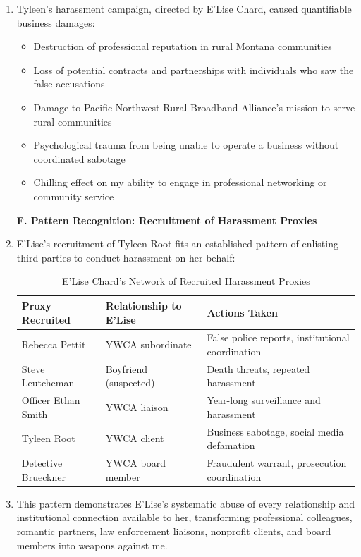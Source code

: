\documentclass[12pt,letterpaper]{article}
\begin{document}
\begin{enumerate}
\textbf{E. Business Damages from Tyleen Root Campaign}

\item Tyleen's harassment campaign, directed by E'Lise Chard, caused quantifiable business damages:

\begin{itemize}
\item Destruction of professional reputation in rural Montana communities
\item Loss of potential contracts and partnerships with individuals who saw the false accusations
\item Damage to Pacific Northwest Rural Broadband Alliance's mission to serve rural communities
\item Psychological trauma from being unable to operate a business without coordinated sabotage
\item Chilling effect on my ability to engage in professional networking or community service
\end{itemize}

\textbf{F. Pattern Recognition: Recruitment of Harassment Proxies}

\item E'Lise's recruitment of Tyleen Root fits an established pattern of enlisting third parties to conduct harassment on her behalf:

\begin{table}[h]
\begin{tabular}{|l|l|l|}
\hline
\textbf{Proxy Recruited} & \textbf{Relationship to E'Lise} & \textbf{Actions Taken} \\
\hline
Rebecca Pettit & YWCA subordinate & False police reports, institutional coordination \\
\hline
Steve Leutcheman & Boyfriend (suspected) & Death threats, repeated harassment \\
\hline
Officer Ethan Smith & YWCA liaison & Year-long surveillance and harassment \\
\hline
Tyleen Root & YWCA client & Business sabotage, social media defamation \\
\hline
Detective Brueckner & YWCA board member & Fraudulent warrant, prosecution coordination \\
\hline
\end{tabular}
\caption{E'Lise Chard's Network of Recruited Harassment Proxies}
\end{table}

\item This pattern demonstrates E'Lise's systematic abuse of every relationship and institutional connection available to her, transforming professional colleagues, romantic partners, law enforcement liaisons, nonprofit clients, and board members into weapons against me.


\end{enumerate}
\end{document}
